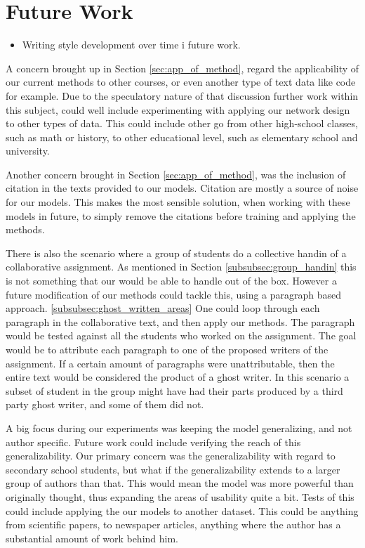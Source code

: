 \section{Future Work} \label{sec:future_work}


\begin{itemize}

    \item Writing style development over time i future work.

\end{itemize}

A concern brought up in Section \ref{sec:app_of_method}, regard the
applicability of our current methods to other courses, or even another type
of text data like code for example. Due to the speculatory nature of that
discussion further work within this subject, could well include experimenting
with applying our network design to other types of data. This could include
other go from other high-school classes, such as math or history, to other
educational level, such as elementary school and university.

Another concern brought in Section \ref{sec:app_of_method}, was the inclusion
of citation in the texts provided to our models. Citation are mostly a source
of noise for our models. This makes the most sensible solution, when working
with these models in future, to simply remove the citations before training and
applying the methods.

There is also the scenario where a group of students do a collective handin of a
collaborative assignment. As mentioned in Section \ref{subsubsec:group_handin}
this is not something that our would be able to handle out of the box. However
a future modification of our methods could tackle this, using a paragraph based
approach. \ref{subsubsec:ghost_written_areas} One could loop through each
paragraph in the collaborative text, and then apply our methods. The paragraph
would be tested against all the students who worked on the assignment. The goal
would be to attribute each paragraph to one of the proposed writers of the
assignment. If a certain amount of paragraphs were unattributable, then the
entire text would be considered the product of a ghost writer. In this scenario
a subset of student in the group might have had their parts produced by a third
party ghost writer, and some of them did not.

A big focus during our experiments was keeping the model generalizing, and
not author specific. Future work could include verifying the reach of this
generalizability. Our primary concern was the generalizability with regard to
secondary school students, but what if the generalizability extends to a larger
group of authors than that. This would mean the model was more powerful than
originally thought, thus expanding the areas of usability quite a bit. Tests
of this could include applying the our models to another dataset. This could
be anything from scientific papers, to newspaper articles, anything where the
author has a substantial amount of work behind him.


